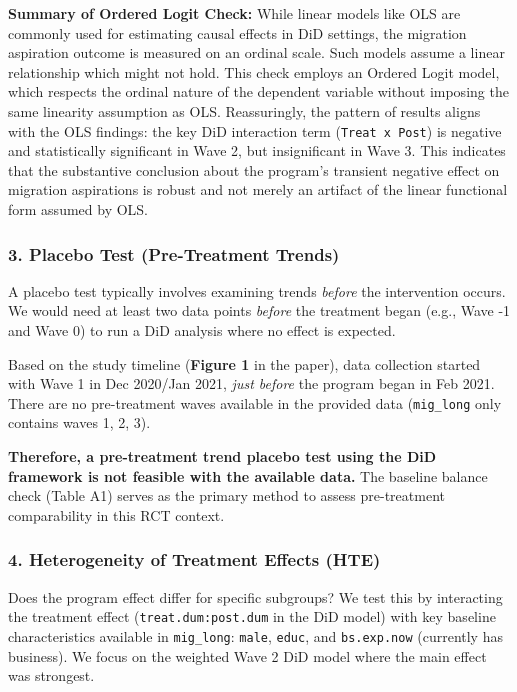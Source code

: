 \documentclass[
]{article}
\begin{document}
\textbf{Summary of Ordered Logit Check:} While linear models like OLS
are commonly used for estimating causal effects in DiD settings, the
migration aspiration outcome is measured on an ordinal scale. Such
models assume a linear relationship which might not hold. This check
employs an Ordered Logit model, which respects the ordinal nature of the
dependent variable without imposing the same linearity assumption as
OLS. Reassuringly, the pattern of results aligns with the OLS findings:
the key DiD interaction term (\texttt{Treat\ x\ Post}) is negative and
statistically significant in Wave 2, but insignificant in Wave 3. This
indicates that the substantive conclusion about the program's transient
negative effect on migration aspirations is robust and not merely an
artifact of the linear functional form assumed by OLS.

\subsubsection{3. Placebo Test (Pre-Treatment
Trends)}\label{placebo-test-pre-treatment-trends}

A placebo test typically involves examining trends \emph{before} the
intervention occurs. We would need at least two data points
\emph{before} the treatment began (e.g., Wave -1 and Wave 0) to run a
DiD analysis where no effect is expected.

Based on the study timeline (\textbf{Figure 1} in the paper), data
collection started with Wave 1 in Dec 2020/Jan 2021, \emph{just before}
the program began in Feb 2021. There are no pre-treatment waves
available in the provided data (\texttt{mig\_long} only contains waves
1, 2, 3).

\textbf{Therefore, a pre-treatment trend placebo test using the DiD
framework is not feasible with the available data.} The baseline balance
check (Table A1) serves as the primary method to assess pre-treatment
comparability in this RCT context.

\subsubsection{4. Heterogeneity of Treatment Effects
(HTE)}\label{heterogeneity-of-treatment-effects-hte}

Does the program effect differ for specific subgroups? We test this by
interacting the treatment effect (\texttt{treat.dum:post.dum} in the DiD
model) with key baseline characteristics available in
\texttt{mig\_long}: \texttt{male}, \texttt{educ}, and
\texttt{bs.exp.now} (currently has business). We focus on the weighted
Wave 2 DiD model where the main effect was strongest.
\end{document}
